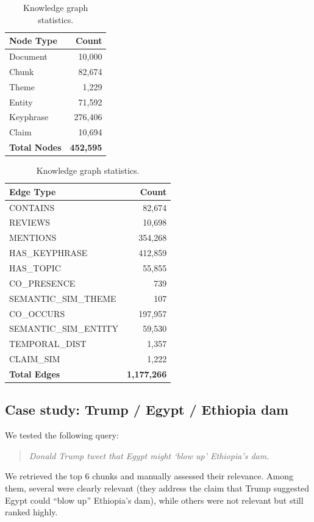 \documentclass[10pt]{article}
\begin{document}
\begin{table}[H]
\centering
\begin{tabular}{lr}
\toprule
\textbf{Node Type} & \textbf{Count} \\
\midrule
Document & 10,000 \\
Chunk & 82,674 \\
Theme & 1,229 \\
Entity & 71,592 \\
Keyphrase & 276,406 \\
Claim & 10,694 \\
\midrule
\textbf{Total Nodes} & \textbf{452,595} \\
\bottomrule
\end{tabular}
\quad
\begin{tabular}{lr}
\toprule
\textbf{Edge Type} & \textbf{Count} \\
\midrule
CONTAINS & 82,674 \\
REVIEWS & 10,698 \\
MENTIONS & 354,268 \\
HAS\_KEYPHRASE & 412,859 \\
HAS\_TOPIC & 55,855 \\
CO\_PRESENCE & 739 \\
SEMANTIC\_SIM\_THEME & 107 \\
CO\_OCCURS & 197,957 \\
SEMANTIC\_SIM\_ENTITY & 59,530 \\
TEMPORAL\_DIST & 1,357 \\
CLAIM\_SIM & 1,222 \\
\midrule
\textbf{Total Edges} & \textbf{1,177,266} \\
\bottomrule
\end{tabular}
\caption{Knowledge graph statistics.}
\label{tab:kg_stats}
\end{table}

\subsection{Case study: Trump / Egypt / Ethiopia dam}

We tested the following query:
\begin{quote}
\emph{Donald Trump tweet that Egypt might `blow up' Ethiopia's dam.}
\end{quote}

We retrieved the top 6 chunks and manually assessed their relevance. Among them, several were clearly relevant (they address the claim that Trump suggested Egypt could ``blow up'' Ethiopia's dam), while others were not relevant but still ranked highly.
\end{document}
